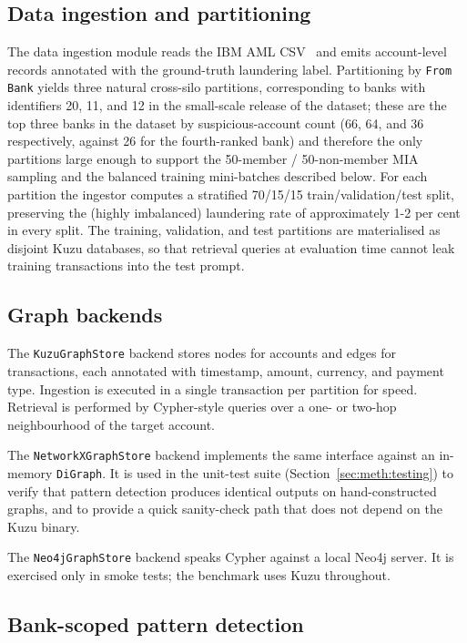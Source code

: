 \documentclass{report}
\begin{document}
\subsection{Data ingestion and partitioning}

The data ingestion module reads the IBM AML CSV~\cite{weber2018scalablegraphlearningantimoney} and emits account-level records annotated with the ground-truth laundering label. Partitioning by \texttt{From Bank} yields three natural cross-silo partitions, corresponding to banks with identifiers 20, 11, and 12 in the small-scale release of the dataset; these are the top three banks in the dataset by suspicious-account count (66, 64, and 36 respectively, against 26 for the fourth-ranked bank) and therefore the only partitions large enough to support the 50-member / 50-non-member MIA sampling and the balanced training mini-batches described below. For each partition the ingestor computes a stratified 70/15/15 train/validation/test split, preserving the (highly imbalanced) laundering rate of approximately 1-2 per cent in every split. The training, validation, and test partitions are materialised as disjoint Kuzu databases, so that retrieval queries at evaluation time cannot leak training transactions into the test prompt.

\subsection{Graph backends}

The \texttt{KuzuGraphStore} backend stores nodes for accounts and edges for transactions, each annotated with timestamp, amount, currency, and payment type. Ingestion is executed in a single transaction per partition for speed. Retrieval is performed by Cypher-style queries over a one- or two-hop neighbourhood of the target account.

The \texttt{NetworkXGraphStore} backend implements the same interface against an in-memory \texttt{DiGraph}. It is used in the unit-test suite (Section~\ref{sec:meth:testing}) to verify that pattern detection produces identical outputs on hand-constructed graphs, and to provide a quick sanity-check path that does not depend on the Kuzu binary.

The \texttt{Neo4jGraphStore} backend speaks Cypher against a local Neo4j server. It is exercised only in smoke tests; the benchmark uses Kuzu throughout.

\subsection{Bank-scoped pattern detection}
\label{sec:meth:impl:patterns}
\end{document}

